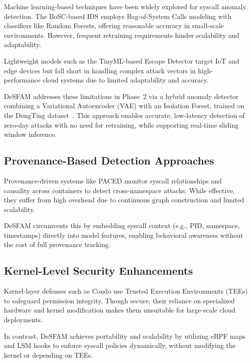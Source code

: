 Machine learning-based techniques have been widely explored for syscall anomaly detection. The
BoSC-based IDS employs Bag-of-System Calls modeling with classifiers like Random Forests,
offering reasonable accuracy in small-scale environments. However, frequent retraining
requirements hinder scalability and adaptability.

Lightweight models such as the TinyML-based Escape Detector target IoT and edge devices but fall
short in handling complex attack vectors in high-performance cloud systems due to limited
adaptability and accuracy.

DeSFAM addresses these limitations in Phase~2 via a hybrid anomaly detector combining a
Variational Autoencoder (VAE) with an Isolation Forest, trained on the DongTing
dataset~\cite{ref26_dongtingdataset}. This approach enables accurate, low-latency detection of
zero-day attacks with no need for retraining, while supporting real-time sliding window
inference.

\subsection{Provenance-Based Detection Approaches}
\label{subsec:provenance}

Provenance-driven systems like PACED monitor syscall relationships and causality across
containers to detect cross-namespace attacks. While effective, they suffer from high overhead
due to continuous graph construction and limited scalability.

DeSFAM circumvents this by embedding syscall context (e.g., PID, namespace, timestamps)
directly into model features, enabling behavioral awareness without the cost of full provenance
tracking.

\subsection{Kernel-Level Security Enhancements}
\label{subsec:kernel_security}

Kernel-layer defenses such as Condo use Trusted Execution Environments (TEEs) to safeguard
permission integrity. Though secure, their reliance on specialized hardware and kernel
modification makes them unsuitable for large-scale cloud deployments.

In contrast, DeSFAM achieves portability and scalability by utilizing eBPF maps and LSM hooks to
enforce syscall policies dynamically, without modifying the kernel or depending on TEEs.

